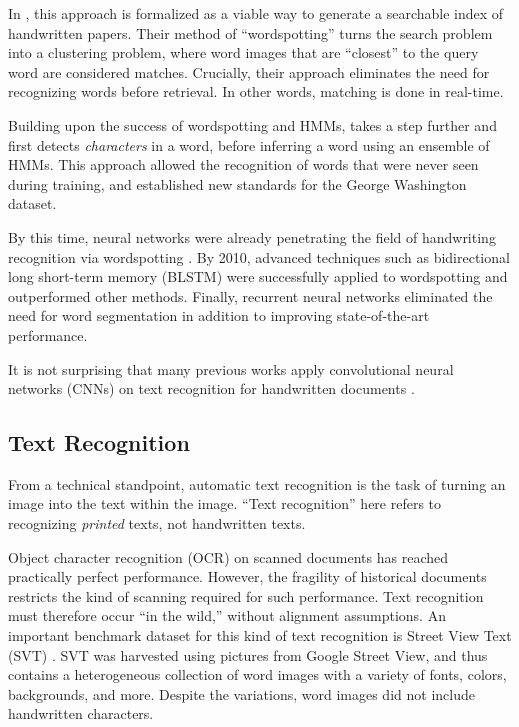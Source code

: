 \documentclass[final]{ukthesis}
\begin{document}
In \cite{rath2007word}, this approach is formalized as a viable way to generate a searchable index of handwritten papers. Their method of ``wordspotting'' turns the search problem into a clustering problem, where word images that are ``closest'' to the query word are considered matches. Crucially, their approach eliminates the need for recognizing words before retrieval. In other words, matching is done in real-time.

Building upon the success of wordspotting and HMMs, \cite{howe2009finding} takes a step further and first detects {\em characters} in a word, before inferring a word using an ensemble of HMMs. This approach allowed the recognition of words that were never seen during training, and established new standards for the George Washington dataset.

By this time, neural networks were already penetrating the field of handwriting recognition via wordspotting \cite{fernandez2007application}. By 2010, advanced techniques such as bidirectional long short-term memory (BLSTM) were successfully applied to wordspotting \cite{wang2010word} and outperformed other methods. Finally, recurrent neural networks \cite{frinken2012novel} eliminated the need for word segmentation in addition to improving state-of-the-art performance.

It is not surprising that many previous works apply convolutional neural networks (CNNs) on text recognition for handwritten documents \cite{zhong2016spottingnet,sudholt2016phocnet}.


\subsection{Text Recognition}
From a technical standpoint, automatic text recognition is the task of turning an image into the text within the image. ``Text recognition'' here refers to recognizing {\em printed} texts, not handwritten texts.

Object character recognition (OCR) on scanned documents has reached practically perfect performance. However, the fragility of historical documents restricts the kind of scanning required for such performance. Text recognition must therefore occur ``in the wild,'' without alignment assumptions. An important benchmark dataset for this kind of text recognition is Street View Text (SVT) \cite{wang2010word}. SVT was harvested using pictures from Google Street View, and thus contains a heterogeneous collection of word images with a variety of fonts, colors, backgrounds, and more. Despite the variations, word images did not include handwritten characters. 
\end{document}
